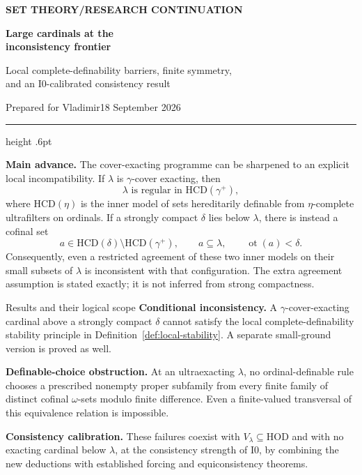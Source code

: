 \documentclass[11pt,letterpaper]{article}
\theoremstyle{definition}
\newcommand{\HOD}{\mathrm{HOD}}
\newcommand{\ot}{\operatorname{ot}}
\newcommand{\Izero}{\mathrm{I0}}
\newcommand{\HCD}{\mathrm{HCD}}
\begin{document}
\thispagestyle{empty}
{\sffamily\bfseries\small\color{Olive}SET THEORY\quad /\quad RESEARCH CONTINUATION}

\vspace{13pt}
{\fontsize{28}{31}\selectfont\bfseries\color{Forest}Large cardinals at the\\ inconsistency frontier\par}
\vspace{10pt}
{\fontsize{14}{18}\selectfont Local complete-definability barriers, finite symmetry,\\ and an $\Izero$-calibrated consistency result\par}
\vspace{14pt}
{\color{Muted}Prepared for Vladimir\hfill 18 September 2026\par}
\vspace{3pt}
{\color{Sage}\hrule height .6pt}
\vspace{12pt}

\textbf{Main advance.} The cover-exacting programme can be sharpened to an explicit local incompatibility. If $\lambda$ is $\gamma$-cover exacting, then
\[
  \lambda\text{ is regular in }\HCD(\gamma^+),
\]
where $\HCD(\eta)$ is the inner model of sets hereditarily definable from $\eta$-complete ultrafilters on ordinals. If a strongly compact $\delta$ lies below $\lambda$, there is instead a cofinal set
\[
 a\in\HCD(\delta)\setminus\HCD(\gamma^+),
 \qquad a\subseteq\lambda,\qquad \ot(a)<\delta.
\]
Consequently, even a restricted agreement of these two inner models on their small subsets of $\lambda$ is inconsistent with that configuration. The extra agreement assumption is stated exactly; it is not inferred from strong compactness.

\begin{assessment}{Results and their logical scope}
\textbf{Conditional inconsistency.} A $\gamma$-cover-exacting cardinal above a strongly compact $\delta$ cannot satisfy the local complete-definability stability principle in Definition~\ref{def:local-stability}. A separate small-ground version is proved as well.

\textbf{Definable-choice obstruction.} At an ultraexacting $\lambda$, no ordinal-definable rule chooses a prescribed nonempty proper subfamily from every finite family of distinct cofinal $\omega$-sets modulo finite difference. Even a finite-valued transversal of this equivalence relation is impossible.

\textbf{Consistency calibration.} These failures coexist with $V_\lambda\subseteq\HOD$ and with no exacting cardinal below $\lambda$, at the consistency strength of $\Izero$, by combining the new deductions with established forcing and equiconsistency theorems.
\end{assessment}
\end{document}
